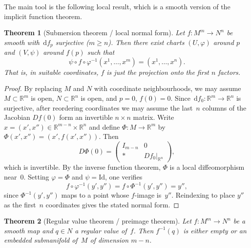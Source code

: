 \documentclass[12pt,a4paper,openany]{book}
\newtheorem{theorem}{Theorem}[section]
\theoremstyle{definition}
\theoremstyle{remark}
\newcommand{\R}{\mathbb{R}}
\newcommand{\Id}{\mathrm{Id}}
\newcommand{\dd}{\,\mathrm{d}}
\begin{document}
The main tool is the following local result, which is a smooth version
of the implicit function theorem.

\begin{theorem}[Submersion theorem / local normal form]%
\label{thm:submersion-local}
Let $f \colon M^m \to N^n$ be smooth with $\dd f_p$ surjective ($m \geq n$).
Then there exist charts $(U, \varphi)$ around $p$ and $(V, \psi)$ around
$f(p)$ such that
\[
  \psi \circ f \circ \varphi^{-1}(x^1, \dots, x^m)
  = (x^1, \dots, x^n).
\]
That is, in suitable coordinates, $f$ is just the projection onto the
first $n$ factors.
\end{theorem}

\begin{proof}
By replacing $M$ and $N$ with coordinate neighbourhoods, we may assume
$M \subset \R^m$ is open, $N \subset \R^n$ is open, and $p = 0$,
$f(0) = 0$.  Since $\dd f_0 \colon \R^m \to \R^n$ is surjective,
after reordering coordinates we may assume the last~$n$ columns of the
Jacobian $Df(0)$ form an invertible $n \times n$ matrix.  Write
$x = (x', x'') \in \R^{m-n} \times \R^n$ and define
$\Phi \colon M \to \R^m$ by $\Phi(x', x'') = (x', f(x', x''))$.
Then
\[
  D\Phi(0) = \begin{pmatrix}
    I_{m-n} & 0 \\ * & Df_0\big|_{\R^n}
  \end{pmatrix},
\]
which is invertible.  By the inverse function theorem,
$\Phi$ is a local diffeomorphism near~$0$.  Setting
$\varphi = \Phi$ and $\psi = \Id$, one verifies
\[
  f \circ \varphi^{-1}(y', y'')
  = f \circ \Phi^{-1}(y', y'')
  = y'',
\]
since $\Phi^{-1}(y', y'')$ maps to a point whose $f$-image is~$y''$.
Reindexing to place $y''$ as the first~$n$ coordinates gives the stated
normal form.
\end{proof}

\begin{theorem}[Regular value theorem / preimage theorem]%
\label{thm:regular-value}%
Let $f \colon M^m \to N^n$ be a smooth map and $q \in N$ a regular value
of~$f$.  Then $f^{-1}(q)$ is either empty or an embedded submanifold
of~$M$ of dimension $m - n$.
\end{theorem}
\end{document}
